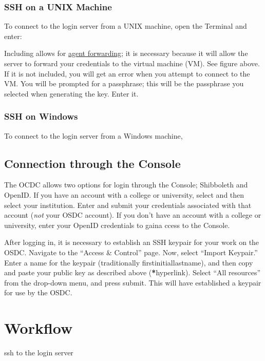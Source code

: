 \documentclass[letterpaper,10pt,english]{sphinxmanual}
\begin{document}
\subsubsection{SSH on a UNIX Machine}
\label{gettingstarted:ssh-on-a-unix-machine}
To connect to the login server from a UNIX machine, open the Terminal and enter:
\begin{quote}

\end{quote}

Including  allows for \href{http://www.unixwiz.net/techtips/ssh-agent-forwarding.html}{agent forwarding}; it is necessary because it will allow the server to forward your credentials to the virtual machine (VM). See figure above. If it is not included, you will get an error when you attempt to connect to the VM. You will be prompted for a passphrase; this will be the passphrase you selected when generating the key. Enter it.


\subsubsection{SSH on Windows}
\label{gettingstarted:ssh-on-windows}
To connect to the login server from a Windows machine,


\subsection{Connection through the Console}
\label{gettingstarted:connection-through-the-console}
The OCDC allows two options for login through the Console; Shibboleth and OpenID. If you have an account with a college or university, select  and then select your institution. Enter and submit your credentials associated with that account (\emph{not} your OSDC account). If you don't have an account with a college or university, enter your OpenID credentials to gaina ccess to the Console.

After logging in, it is necessary to establish an SSH keypair for your work on the OSDC. Navigate to the ``Access \& Control'' page. Now, select ``Import Keypair.'' Enter a name for the keypair (traditionally firstinitiallastname), and then copy and paste your public key as described above ({\color{red}\bfseries{}*}hyperlink). Select ``All resources'' from the drop-down menu, and press submit. This will have established a keypair for use by the OSDC.


\section{Workflow}
\label{gettingstarted:workflow}
ssh to the login server
\end{document}
